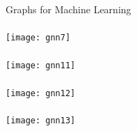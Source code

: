 \begin{frame}[fragile]\frametitle{}
\begin{center}
{\Large Graphs for Machine Learning}
\end{center}
\end{frame}


\begin{frame}[fragile]\frametitle{}

\begin{center}
\texttt{[image: gnn7]}
\end{center}	  

\end{frame}


\begin{frame}[fragile]\frametitle{}

\begin{center}
\texttt{[image: gnn11]}
\end{center}	  

\end{frame}

\begin{frame}[fragile]\frametitle{}

\begin{center}
\texttt{[image: gnn12]}
\end{center}	  

\end{frame}


\begin{frame}[fragile]\frametitle{}

\begin{center}
\texttt{[image: gnn13]}
\end{center}	  

\end{frame}


